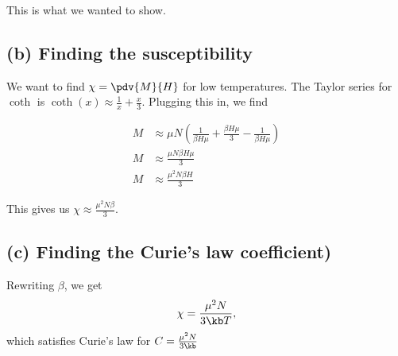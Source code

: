 \documentclass[../../PS3.tex]{subfiles}
\begin{document}
This is what we wanted to show.

\subsection*{(b) Finding the susceptibility}
We want to find $\chi = \pdv{M}{H}$ for low temperatures. The Taylor series for $\coth$ is $\coth(x) \approx \frac{1}{x} + \frac{x}{3}$. Plugging this in, we find

\begin{align}
	M &\approx \mu N \left( \frac{1}{\beta H \mu} + \frac{\beta H \mu}{3} - \frac{1}{\beta H \mu} \right)\\
	M &\approx \frac{\mu N \beta H \mu}{3} \\
	M &\approx \frac{\mu^2 N \beta H }{3}
\end{align}

This gives us $\chi \approx \frac{\mu^2 N \beta}{3}$.

\subsection*{(c) Finding the Curie's law coefficient)}
Rewriting $\beta$, we get 
\begin{equation}
	\chi = \frac{\mu ^2 N}{3 \kb T},
\end{equation}
which satisfies Curie's law for $C = \frac{\mu^2 N}{3\kb}$
\end{document}

